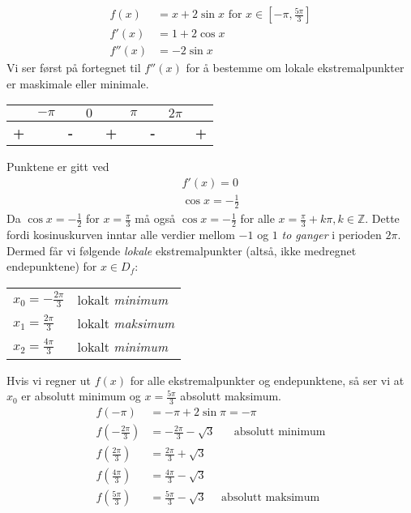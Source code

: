 \documentclass[a4paper,norsk,12pt]{article}
\begin{document}
\begin{align*}
  f(x) &= x+2\sin{x} \text{ for } x \in \left[-\pi, \frac{5\pi}{3}\right] \\
  f'(x) &= 1 + 2\cos{x} \\
  f''(x) &= -2\sin{x}
\end{align*}
Vi ser først på fortegnet til $f''(x)$ for å bestemme om lokale
ekstremalpunkter er maskimale eller minimale.
\begin{table}[h]
  \centering
\begin{tabular}{ccccccccc}
  & $-\pi$
  &
  & $0$
  &
  & $\pi$
  &
  & $2\pi$
  &
\\ \hline
    \textbf{\large{+}}
& & \textbf{\large{-}}
& & \textbf{\large{+}}
& & \textbf{\large{-}}
& & \textbf{\large{+}}
\end{tabular}
\end{table}

Punktene er gitt ved
\begin{align*}
  f'(x) = 0 \\
  \cos{x} = -\frac{1}{2}
\end{align*}
Da $\cos{x} = -\frac{1}{2}$ for $x=\frac{\pi}{3}$ må også
$\cos{x}=-\frac{1}{2}$ for alle $x = \frac{\pi}{3} + k\pi, k \in \mathbb{Z}$.
Dette fordi kosinuskurven inntar alle verdier mellom $-1$ og $1$ \textit{to
ganger} i perioden $2\pi$. Dermed får vi følgende \textit{lokale} ekstremalpunkter
(altså, ikke medregnet endepunktene) for $x \in D_f$:
\begin{table}[h]
  \centering
  \begin{tabular}{ll}
    $x_0 = -\frac{2\pi}{3}$ & lokalt \textit{minimum} \\
    $x_1 =  \frac{2\pi}{3}$ & lokalt \textit{maksimum} \\
    $x_2 =  \frac{4\pi}{3}$ & lokalt \textit{minimum}
  \end{tabular}
\end{table}

Hvis vi regner ut $f(x)$ for alle ekstremalpunkter og endepunktene, så ser vi
at $x_0$ er absolutt minimum og $x=\frac{5\pi}{3}$ absolutt maksimum.
\begin{align*}
  f(-\pi) &= -\pi + 2\sin{\pi} = -\pi \\
  f(-\frac{2\pi}{3}) &= -\frac{2\pi}{3} - \sqrt{3} \text{~ ~  absolutt minimum} \\
  f(\frac{2\pi}{3}) &= \frac{2\pi}{3} + \sqrt{3} \\
  f(\frac{4\pi}{3}) &= \frac{4\pi}{3} - \sqrt{3} \\
  f(\frac{5\pi}{3}) &= \frac{5\pi}{3} - \sqrt{3} \text{~ ~ absolutt maksimum}
\end{align*}
\end{document}
